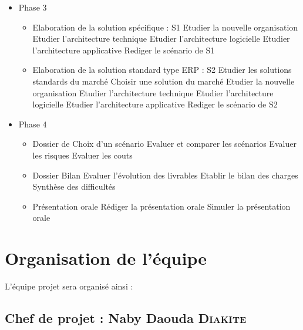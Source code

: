 \begin{itemize}
\begin{itemize}
        \item Phase 3
        \begin{itemize}
            \item Elaboration de la solution spécifique : S1
                \subitem Etudier la nouvelle organisation
                \subitem Etudier l’architecture technique
                \subitem Etudier l’architecture logicielle
                \subitem Etudier l’architecture applicative
                \subitem Rediger le scénario de S1
            \item Elaboration de la solution standard type ERP : S2
                \subitem Etudier les solutions standards du marché
                \subitem Choisir une solution du marché
                \subitem Etudier la nouvelle organisation
                \subitem Etudier l’architecture technique
                \subitem Etudier l’architecture logicielle
                \subitem Etudier l’architecture applicative
                \subitem Rediger le scénario de S2
        \end{itemize}

        \item Phase 4
        \begin{itemize}
            \item Dossier de Choix d’un scénario
                \subitem Evaluer et comparer les scénarios
                \subitem Evaluer les risques
                \subitem Evaluer les couts
            \item Dossier Bilan
                \subitem Evaluer l’évolution des livrables
                \subitem Etablir le bilan des charges
                \subitem Synthèse des difficultés
            \item Présentation orale
                \subitem Rédiger la présentation orale
                \subitem Simuler la présentation orale
        \end{itemize}
    \end{itemize}
\end{itemize}
\section{Organisation de l'équipe}

L’équipe projet sera organisé ainsi :
\subsection{Chef de projet : Naby Daouda \textsc{Diakite}}

